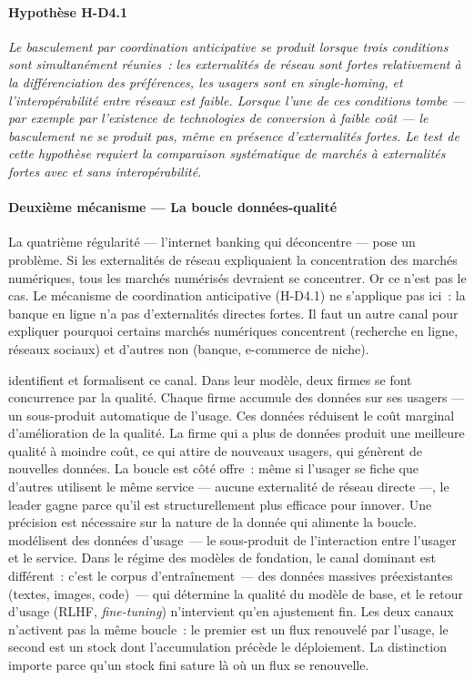 \paragraph{Hypothèse H-D4.1} \emph{Le basculement par coordination anticipative se produit lorsque trois conditions sont simultanément réunies~: les externalités de réseau sont fortes relativement à la différenciation des préférences, les usagers sont en \emph{single-homing}, et l'interopérabilité entre réseaux est faible. Lorsque l'une de ces conditions tombe --- par exemple par l'existence de technologies de conversion à faible coût --- le basculement ne se produit pas, même en présence d'externalités fortes. Le test de cette hypothèse requiert la comparaison systématique de marchés à externalités fortes avec et sans interopérabilité.}


\paragraph{Deuxième mécanisme --- La boucle données-qualité}

\markNEO \markEVO

La quatrième régularité --- l'internet banking qui déconcentre --- pose un problème. Si les externalités de réseau expliquaient la concentration des marchés numériques, tous les marchés numérisés devraient se concentrer. Or ce n'est pas le cas. Le mécanisme de coordination anticipative (H-D4.1) ne s'applique pas ici~: la banque en ligne n'a pas d'externalités directes fortes. Il faut un autre canal pour expliquer pourquoi certains marchés numériques concentrent (recherche en ligne, réseaux sociaux) et d'autres non (banque, e-commerce de niche).

\textcite{pruefer_competing_2021} identifient et formalisent ce canal. Dans leur modèle, deux firmes se font concurrence par la qualité. Chaque firme accumule des données sur ses usagers --- un sous-produit automatique de l'usage. Ces données réduisent le coût marginal d'amélioration de la qualité. La firme qui a plus de données produit une meilleure qualité à moindre coût, ce qui attire de nouveaux usagers, qui génèrent de nouvelles données. La boucle est côté offre~: même si l'usager se fiche que d'autres utilisent le même service --- aucune externalité de réseau directe ---, le leader gagne parce qu'il est structurellement plus efficace pour innover. Une précision est nécessaire sur la nature de la donnée qui alimente la boucle. \textcite{pruefer_competing_2021} modélisent des données d'usage~--- le sous-produit de l'interaction entre l'usager et le service. Dans le régime des modèles de fondation, le canal dominant est différent~: c'est le corpus d'entraînement~--- des données massives préexistantes (textes, images, code)~--- qui détermine la qualité du modèle de base, et le retour d'usage (RLHF, \emph{fine-tuning}) n'intervient qu'en ajustement fin. Les deux canaux n'activent pas la même boucle~: le premier est un flux renouvelé par l'usage, le second est un stock dont l'accumulation précède le déploiement. La distinction importe parce qu'un stock fini sature là où un flux se renouvelle.

